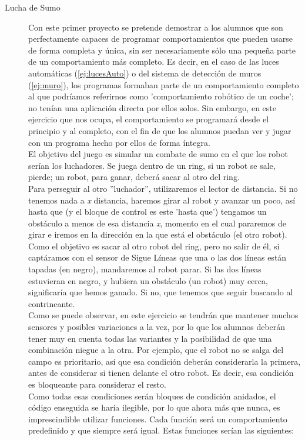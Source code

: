 \begin{description}
	\item[Lucha de Sumo]\label{ej:sumo}
	Con este primer proyecto se pretende demostrar a los alumnos que son perfectamente capaces de programar comportamientos que pueden usarse de forma completa y única, sin ser necesariamente sólo una pequeña parte de un comportamiento más completo. Es decir, en el caso de las luces automáticas (\ref{ej:lucesAuto}) o del sistema de detección de muros (\ref{ej:muro}), los programas formaban parte de un comportamiento completo al que podríamos referirnos como 'comportamiento robótico de un coche'; no tenían una aplicación directa por ellos solos. Sin embargo, en este ejercicio que nos ocupa, el comportamiento se programará desde el principio y al completo, con el fin de que los alumnos puedan ver y jugar con un programa hecho por ellos de forma íntegra. \\
	El objetivo del juego es simular un combate de sumo en el que los robot serían los luchadores. Se juega dentro de un ring, si un robot se sale, pierde; un robot, para ganar, deberá sacar al otro del ring. \\
	Para perseguir al otro ''luchador'', utilizaremos el lector de distancia. Si no tenemos nada a \textit{x} distancia, haremos girar al robot y avanzar un poco, así hasta que (y el bloque de control es este 'hasta que') tengamos un obstáculo a menos de esa distancia \textit{x}, momento en el cual pararemos de girar e iremos en la dirección en la que está el obstáculo (el otro robot). Como el objetivo es sacar al otro robot del ring, pero no salir de él, si captáramos con el sensor de Sigue Líneas que una o las dos líneas están tapadas (en negro), mandaremos al robot parar. Si las dos líneas estuvieran en negro, y hubiera un obstáculo (un robot) muy cerca, significaría que hemos ganado. Si no, que tenemos que seguir buscando al contrincante.\\	
	Como se puede observar, en este ejercicio se tendrán que mantener muchos sensores y posibles variaciones a la vez, por lo que los alumnos deberán tener muy en cuenta todas las variantes y la posibilidad de que una combinación niegue a la otra. Por ejemplo, que el robot no se salga del campo es prioritario, así que esa condición deberán considerarla la primera, antes de considerar si tienen delante el otro robot. Es decir, esa condición es bloqueante para considerar el resto.\\
	Como todas esas condiciones serán bloques de condición anidados, el código enseguida se haría ilegible, por lo que ahora más que nunca, es imprescindible utilizar funciones. Cada función será un comportamiento predefinido y que siempre será igual. Estas funciones serían las siguientes:

\end{description}
